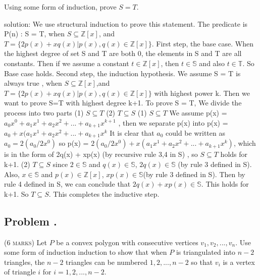 \documentclass[12pt]{article}
\newcounter{ProblemNum}
\renewcommand{\theProblemNum}{\arabic{ProblemNum}}
\newcommand*{\anyproblem}[1]{\newpage\subsection*{#1}}
\newcommand*{\problem}[1]{\stepcounter{ProblemNum} %
\anyproblem{Problem \theProblemNum. \; #1}}
\begin{document}
Using some form of induction, prove $S=T$. \vskip5pt


solution:  We use structural induction to prove this statement. \vskip5pt
The predicate is P(n) : S = T, when $S\subseteq \mathbb{Z}[x]$, and $T=\{2p(x)+xq(x)|p(x),q(x)\in\mathbb{Z}[x]\}$.\vskip5pt
First step, the base case. When the highest degree of  set S and T are both 0, the elements in S and T are all constants. Then if we assume a constant $t\in\mathbb{Z}[x]$, then $t\in\mathbb{S}$ and also $t\in\mathbb{T}$. So Base case holds.\vskip5pt
Second step, the induction hypothesis. We assume S = T is always true , when $S\subseteq\mathbb{Z}[x]$,and $T=\{2p(x)+xq(x)|p(x),q(x)\in\mathbb{Z}[x]\}$ with highest power k. Then we want to prove S=T with highest degree k+1.
To prove S = T, We divide the process into two parts (1) $S\subseteq T$ (2) $T\subseteq S$ \vskip5pt
(1) $S\subseteq T$\vskip5pt
We assume p(x) = $a_0x^0 + a_1x^1 + a_2x^2 + ...+ a_{k+1}x^{k+1}$ , \vskip5pt
then we separate p(x) into p(x) = $a_0 + x(a_1x^1 + a_2x^2 + ...+ a_{k+1}x^k$ \vskip5pt
It is clear that $a_0$ could be written as $a_0 = 2(a_0/2 x^0)$\vskip5pt
so p(x) = $2(a_0/2x^0) + x(a_1x^1 + a_2x^2 + ...+ a_{k+1}x^k)$, which is in the form of 2q(x) + xp(x) (by recursive rule 3,4 in S) , so $S\subseteq T$ holds for k+1.\vskip5pt
(2)  $T\subseteq S$ \vskip5pt
since $2\in\mathbb{S}$ and $q(x)\in\mathbb{S}$, $2q(x)\in\mathbb{S}$ (by rule 3 defined in S).\vskip5pt
Also, $x\in\mathbb{S}$ and $p(x)\in\mathbb{Z}[x]$, $xp(x)\in\mathbb{S}$(by rule 3 defined in S).\vskip5pt
Then by rule 4 defined in S, we can conclude that ${2q(x) + xp(x)} \in\mathbb{S}$. This holds for k+1. So $T\subseteq S$. This completes the inductive step.





                




\problem{}
\textsc{(6 marks)} Let $P$ be a convex polygon with consecutive vertices $v_1, v_2, ..., v_n$.
          Use some form of induction induction to show that when $P$ is triangulated into $n - 2$ triangles, 
          the $n - 2$ triangles can be numbered $1, 2, ..., n - 2$ so that $v_i$ is a vertex of 
          triangle $i$ for $i = 1, 2, ..., n-2$. 
\end{document}
